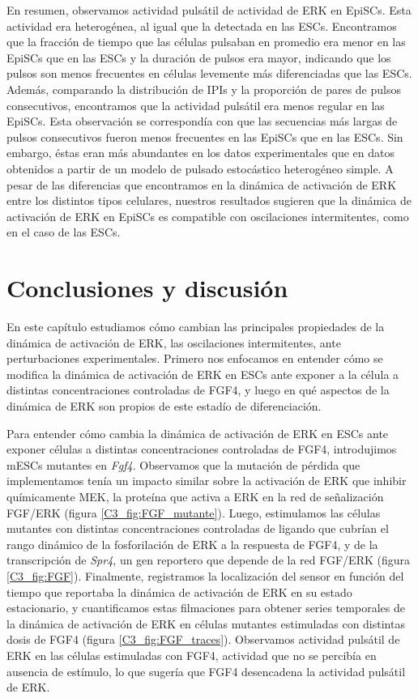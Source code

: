 \documentclass[./main.tex]{subfiles}
\begin{document}
En resumen, observamos actividad pulsátil de actividad de ERK en EpiSCs. Esta actividad era heterogénea, al igual que la detectada en las ESCs. Encontramos que la fracción de tiempo que las células pulsaban en promedio era menor en las EpiSCs que en las ESCs y la duración de pulsos era mayor, indicando que los pulsos son menos frecuentes en células levemente más diferenciadas que las ESCs. Además, comparando la distribución de IPIs y la proporción de pares de pulsos consecutivos, encontramos que la actividad pulsátil era menos regular en las EpiSCs. Esta observación se correspondía con que las secuencias más largas de pulsos consecutivos fueron menos frecuentes en las EpiSCs que en las ESCs. Sin embargo, éstas eran más abundantes en los datos experimentales que en datos obtenidos a partir de un modelo de pulsado estocástico heterogéneo simple. A pesar de las diferencias que encontramos en la dinámica de activación de ERK entre los distintos tipos celulares, nuestros resultados sugieren que la dinámica de activación de ERK en EpiSCs es compatible con oscilaciones intermitentes, como en el caso de las ESCs.


\section{Conclusiones y discusión}


En este capítulo estudiamos cómo cambian las principales propiedades de la dinámica de activación de ERK, las oscilaciones intermitentes, ante perturbaciones experimentales. Primero nos enfocamos en entender cómo se modifica la dinámica de activación de ERK en ESCs ante exponer a la célula a distintas concentraciones controladas de FGF4, y luego en qué aspectos de la dinámica de ERK son propios de este estadío de diferenciación.


Para entender cómo cambia la dinámica de activación de ERK en ESCs ante exponer células a distintas concentraciones controladas de FGF4, introdujimos mESCs mutantes en \textit{Fgf4}. Observamos que la mutación de pérdida que implementamos tenía un impacto similar sobre la activación de ERK que inhibir químicamente MEK, la proteína que activa a ERK en la red de señalización FGF/ERK (figura \ref{C3_fig:FGF_mutante}). Luego, estimulamos las células mutantes con distintas concentraciones controladas de ligando que cubrían el rango dinámico de la fosforilación de ERK a la respuesta de FGF4, y de la transcripción de \textit{Spr4}, un gen reportero que depende de la red FGF/ERK (figura \ref{C3_fig:FGF}). Finalmente, registramos la localización del sensor en función del tiempo que reportaba la dinámica de activación de ERK en su estado estacionario, y cuantificamos estas filmaciones para obtener series temporales de la dinámica de activación de ERK en células mutantes estimuladas con distintas dosis de FGF4 (figura \ref{C3_fig:FGF_traces}). Observamos actividad pulsátil de ERK en las células estimuladas con FGF4, actividad que no se percibía en ausencia de estímulo, lo que sugería que FGF4 desencadena la actividad pulsátil de ERK. 
\end{document}
